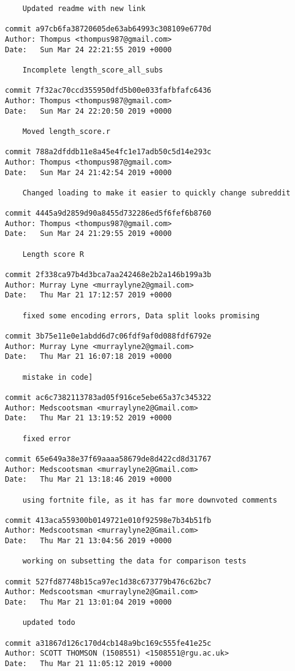 \begin{lstlisting}
    Updated readme with new link

commit a97cb6fa38720605de63ab64993c308109e6770d
Author: Thompus <thompus987@gmail.com>
Date:   Sun Mar 24 22:21:55 2019 +0000

    Incomplete length_score_all_subs

commit 7f32ac70ccd355950dfd5b00e033fafbfafc6436
Author: Thompus <thompus987@gmail.com>
Date:   Sun Mar 24 22:20:50 2019 +0000

    Moved length_score.r

commit 788a2dfddb11e8a45e4fc1e17adb50c5d14e293c
Author: Thompus <thompus987@gmail.com>
Date:   Sun Mar 24 21:42:54 2019 +0000

    Changed loading to make it easier to quickly change subreddit

commit 4445a9d2859d90a8455d732286ed5f6fef6b8760
Author: Thompus <thompus987@gmail.com>
Date:   Sun Mar 24 21:29:55 2019 +0000

    Length score R

commit 2f338ca97b4d3bca7aa242468e2b2a146b199a3b
Author: Murray Lyne <murraylyne2@gmail.com>
Date:   Thu Mar 21 17:12:57 2019 +0000

    fixed some encoding errors, Data split looks promising

commit 3b75e11e0e1abdd6d7c06fdf9af0d088fdf6792e
Author: Murray Lyne <murraylyne2@gmail.com>
Date:   Thu Mar 21 16:07:18 2019 +0000

    mistake in code]

commit ac6c7382113783ad05f916ce5ebe65a37c345322
Author: Medscootsman <murraylyne2@Gmail.com>
Date:   Thu Mar 21 13:19:52 2019 +0000

    fixed error

commit 65e649a38e37f69aaaa58679de8d422cd8d31767
Author: Medscootsman <murraylyne2@Gmail.com>
Date:   Thu Mar 21 13:18:46 2019 +0000

    using fortnite file, as it has far more downvoted comments

commit 413aca559300b0149721e010f92598e7b34b51fb
Author: Medscootsman <murraylyne2@Gmail.com>
Date:   Thu Mar 21 13:04:56 2019 +0000

    working on subsetting the data for comparison tests

commit 527fd87748b15ca97ec1d38c673779b476c62bc7
Author: Medscootsman <murraylyne2@Gmail.com>
Date:   Thu Mar 21 13:01:04 2019 +0000

    updated todo

commit a31867d126c170d4cb148a9bc169c555fe41e25c
Author: SCOTT THOMSON (1508551) <1508551@rgu.ac.uk>
Date:   Thu Mar 21 11:05:12 2019 +0000


\end{lstlisting}
